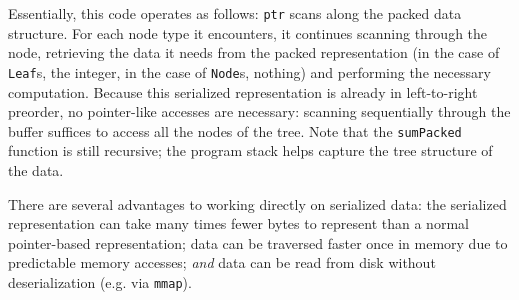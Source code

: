 \documentclass[showabstract,showacknowledgments,showpreface,showdedication]{iuphd}
\theoremstyle{nonumberplain}
\newcommand{\il}[1]{\lstinline[style=inline,mathescape=true];#1;}
\begin{document}
Essentially, this code operates as follows: \il{ptr} scans along the packed
data structure. For each node type it encounters, it continues scanning
through the node, retrieving the data it needs from the packed representation
(in the case of \il{Leaf}s, the integer, in the case of \il{Node}s,
nothing) and performing the necessary computation. Because this serialized
representation is already in left-to-right preorder, no pointer-like
accesses are necessary: scanning sequentially through the buffer suffices to
access all the nodes of the tree. Note that the \il{sumPacked} function is
still recursive; the program stack helps capture the tree structure of the
data.





There are several advantages to working directly on serialized data: the
serialized representation can take many times fewer bytes to represent than
a normal pointer-based representation; data can be traversed faster once in
memory due to predictable memory accesses; \emph{and} data can be read from
disk without deserialization (e.g. via \texttt{mmap}).
%
\end{document}
